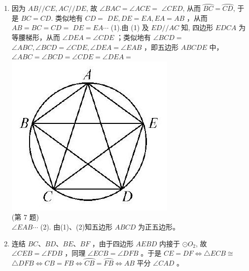 \documentclass[10pt]{article}
\begin{document}
\begin{enumerate}
(第6 题)
  \item 因为 $A B / / C E, A C / / D E$, 故 $\angle B A C=\angle A C E=$ $\angle C E D$, 从而 $\overparen{B C}=\overparen{C D}$, 于是 $B C=C D$. 类似地有 $C D=$ $D E, D E=E A, E A=A B$ ，从而 $A B=B C=C D=$ $D E=E A \cdots$ (1).由 (1) 及 $E D / / A C$ 知, 四边形 $E D C A$ 为等腰梯形，从而 $\angle D E A=\angle C D E$ ；类似地有 $\angle B C D=$ $\angle A B C, \angle B C D=\angle C D E, \angle D E A=\angle E A B$ ，即五边形 $A B C D E$ 中， $\angle A B C=\angle B C D=\angle C D E=\angle D E A=$\\
\includegraphics[max width=\textwidth, center]{2024_10_30_66b8e5e701da2093c133g-090}\\
(第 7 题)\\
$\angle E A B \cdots$ (2). 由(1)、(2)知五边形 $A B C D$ 为正五边形。
  \item 连结 $B C 、 B D 、 B E 、 B F$ ，由于四边形 $A E B D$ 内接于 $\odot O_{2}$, 故 $\angle C E B=\angle F D B$ ，同理 $\angle E C B=\angle D F B$ 。于是 $C E=D F \Leftrightarrow \triangle E C B \cong$ $\triangle D F B \Leftrightarrow C B=F B \Leftrightarrow \overparen{C B}=\overparen{F B} \Leftrightarrow A B$ 平分 $\angle C A D$ 。\\

\end{enumerate}
\end{document}
